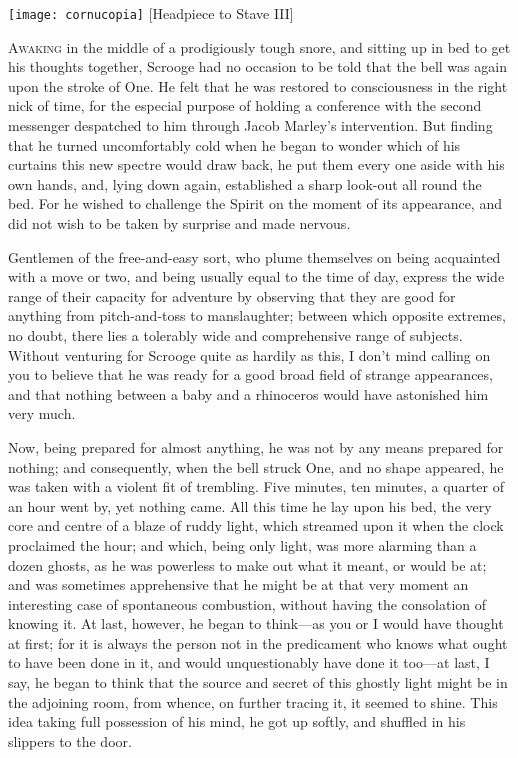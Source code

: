 \begin{minipage}[c]{\textwidth}
\texttt{[image: cornucopia]}
[Headpiece to Stave III]{}
\end{minipage}
\vfill

\lettrine[lines=4]{A}{waking} in the middle of a prodigiously tough snore, and sitting up in bed to get his thoughts together, Scrooge had no occasion to be told that the bell was again upon the stroke of One. He felt that he was restored to consciousness in the right nick of time, for the especial purpose of holding a conference with the second messenger despatched to him through Jacob Marley's intervention. But finding that he turned uncomfortably cold when he began to wonder which of his curtains this new spectre would draw back, he put them every one aside with his own hands, and, lying down again, established a sharp look-out all round the bed. For he wished to challenge the Spirit on the moment of its appearance, and did not wish to be taken by surprise and made nervous.

Gentlemen of the free-and-easy sort, who plume themselves on being acquainted with a move or two, and being usually equal to the time of day, express the wide range of their capacity for adventure by observing that they are good for anything from pitch-and-toss to manslaughter; between which opposite extremes, no doubt, there lies a tolerably wide and comprehensive range of subjects. Without venturing for Scrooge quite as hardily as this, I don't mind calling on you to believe that he was ready for a good broad field of strange appearances, and that nothing between a baby and a rhinoceros would have astonished him very much.

Now, being prepared for almost anything, he was not by any means prepared for nothing; and consequently, when the bell  struck One, and no shape appeared, he was taken with a violent fit of trembling. Five minutes, ten minutes, a quarter of an hour went by, yet nothing came. All this time he lay upon his bed, the very core and centre of a blaze of ruddy light, which streamed upon it when the clock proclaimed the hour; and which, being only light, was more alarming than a dozen ghosts, as he was powerless to make out what it meant, or would be at; and was sometimes apprehensive that he might be at that very moment an interesting case of spontaneous combustion, without having the consolation of knowing it. At last, however, he began to think—as you or I would have thought at first; for it is always the person not in the predicament who knows what ought to have been done in it, and would unquestionably have done it too—at last, I say, he began to think that the source and secret of this ghostly light might be in the adjoining room, from whence, on further tracing it, it seemed to shine. This idea taking full possession of his mind, he got up softly, and shuffled in his slippers to the door.

